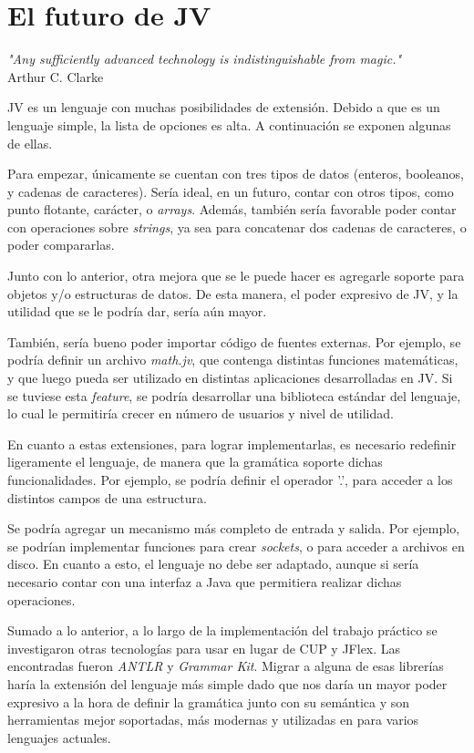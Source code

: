 \documentclass[spanish]{article}
\begin{document}
    \section{El futuro de JV}
        \begin{center}
            \par\textit{"Any sufficiently advanced technology is indistinguishable from magic."}\\Arthur C. Clarke\\
        \end{center}
        \par JV es un lenguaje con muchas posibilidades de extensión. Debido a que es un lenguaje simple, la lista de opciones es alta. A continuación se exponen algunas de ellas.
        \par Para empezar, únicamente se cuentan con tres tipos de datos (enteros, booleanos, y cadenas de caracteres). Sería ideal, en un futuro, contar con otros tipos, como punto flotante, carácter, o \textit{arrays}. Además, también sería favorable poder contar con operaciones sobre \textit{strings}, ya sea para concatenar dos cadenas de caracteres, o poder compararlas.
        \par Junto con lo anterior, otra mejora que se le puede hacer es agregarle soporte para objetos y/o estructuras de datos. De esta manera, el poder expresivo de JV, y la utilidad que se le podría dar, sería aún mayor.
        \par También, sería bueno poder importar código de fuentes externas. Por ejemplo, se podría definir un archivo \textit{math.jv}, que contenga distintas funciones matemáticas, y que luego pueda ser utilizado en distintas aplicaciones desarrolladas en JV. Si se tuviese esta \textit{feature}, se podría desarrollar una biblioteca estándar del lenguaje, lo cual le permitiría crecer en número de usuarios y nivel de utilidad.
        \par En cuanto a estas extensiones, para lograr implementarlas, es necesario redefinir ligeramente el lenguaje, de manera que la gramática soporte dichas funcionalidades. Por ejemplo, se podría definir el operador '.', para acceder a los distintos campos de una estructura.
        \par Se podría agregar un mecanismo más completo de entrada y salida. Por ejemplo, se podrían implementar funciones para crear \textit{sockets}, o para acceder a archivos en disco. En cuanto a esto, el lenguaje no debe ser adaptado, aunque si sería necesario contar con una interfaz a Java que permitiera realizar dichas operaciones.
            \par Sumado a lo anterior, a lo largo de la implementación del trabajo práctico se investigaron otras tecnologías para usar en lugar de CUP y JFlex. Las encontradas fueron \textit{ANTLR} y \textit{Grammar Kit}. Migrar a alguna de esas librerías haría la extensión del lenguaje más simple dado que nos daría un mayor poder expresivo a la hora de definir la gramática junto con su semántica y son herramientas mejor soportadas, más modernas y utilizadas en para varios lenguajes actuales.
    \clearpage
\end{document}
